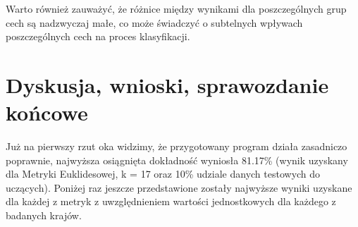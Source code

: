 \documentclass{article}
\begin{document}
\noindent Warto również zauważyć, że różnice między wynikami dla poszczególnych grup cech są nadzwyczaj małe, co może świadczyć o subtelnych wpływach poszczególnych cech na proces klasyfikacji. \\





\section{Dyskusja, wnioski, sprawozdanie końcowe}

Już na pierwszy rzut oka widzimy, że przygotowany program działa zasadniczo poprawnie, najwyższa osiągnięta dokładność wyniosła 81.17\% (wynik uzyskany dla Metryki Euklidesowej, k = 17 oraz 10\% udziale danych testowych do uczących). Poniżej raz jeszcze przedstawione zostały najwyższe wyniki uzyskane dla każdej z metryk z uwzględnieniem wartości jednostkowych dla każdego z badanych krajów. \\
\end{document}
